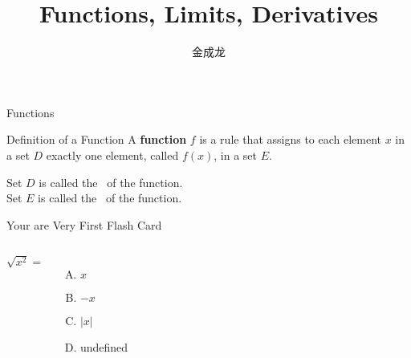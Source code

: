 \documentclass{ctexbeamer}
\title[Short Title]{Functions, Limits, Derivatives}
\author[_king]{\heiti 金成龙}
\institute{\textbf{Institute}: this is my first slide made by \LaTeX}
\date{}
\begin{document}

\begin{frame}
\titlepage
\end{frame}


\begin{frame}[t]{Functions}\vspace{4pt}

\begin{block}{Definition of a Function}
\vspace{0.5em}
A \textbf{function} $f$ is a rule that assigns to each element $x$ in a 
set $D$ exactly one element, called $f(x)$, in a set $E$. 
\vspace{0.5em}
\end{block}

\vspace{10pt}
Set $D$ is called the 
\, of the function.\\[10pt]
 
Set $E$ is called the 
\, of the function.

\end{frame}

\begin{frame}{Your are Very First Flash Card}\vspace{10pt}
\begin{columns}[onlytextwidth]

$\sqrt{x^2}=$\\[10pt]
\begin{enumerate}[(A)]
\item $x$
\item $-x$
\item $|x|$
\item undefined
\end{enumerate}

\end{columns}
\end{frame}
\end{document}
